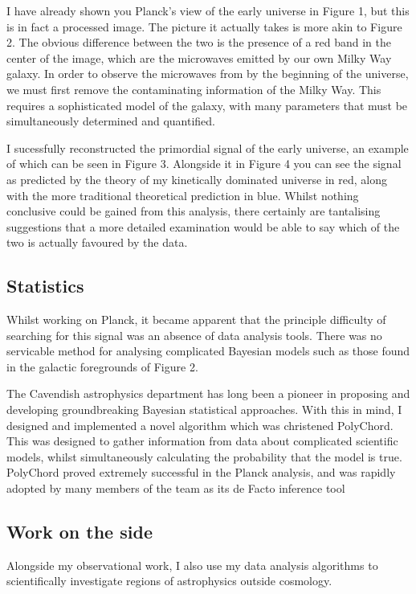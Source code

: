 I have already shown you Planck's view of the early universe in Figure 1, but this is in fact a processed image. The picture it actually takes is more akin to Figure 2. The obvious difference between the two is the presence of a red band in the center of the image, which are the microwaves emitted by our own Milky Way galaxy. In order to observe the microwaves from by the beginning of the universe, we must first remove the contaminating information of the Milky Way. This requires a sophisticated model of the galaxy, with many parameters that must be simultaneously determined and quantified. 

I sucessfully reconstructed the primordial signal of the early universe, an example of which can be seen in Figure 3. Alongside it in Figure 4 you can see the signal as predicted by the theory of my kinetically dominated universe in red, along with the more traditional theoretical prediction in blue. Whilst nothing conclusive could be gained from this analysis, there certainly are tantalising suggestions that a more detailed examination would be able to say which of the two is actually favoured by the data.

\subsection{Statistics}
Whilst working on Planck, it became apparent that the principle difficulty of searching for this signal was an absence of data analysis tools. There was no servicable method for analysing complicated Bayesian models such as those found in the galactic foregrounds of Figure 2.

The Cavendish astrophysics department has long been a pioneer in proposing and developing groundbreaking Bayesian statistical approaches. With this in mind, I designed and implemented a novel algorithm which was christened PolyChord. This was designed to gather information from data about complicated scientific models, whilst simultaneously calculating the probability that the model is true.  PolyChord proved extremely successful in the Planck analysis, and was rapidly adopted by many members of the team as its de Facto inference tool

\subsection{Work on the side}
Alongside my observational work, I also use my data analysis algorithms to scientifically investigate regions of astrophysics outside cosmology.

